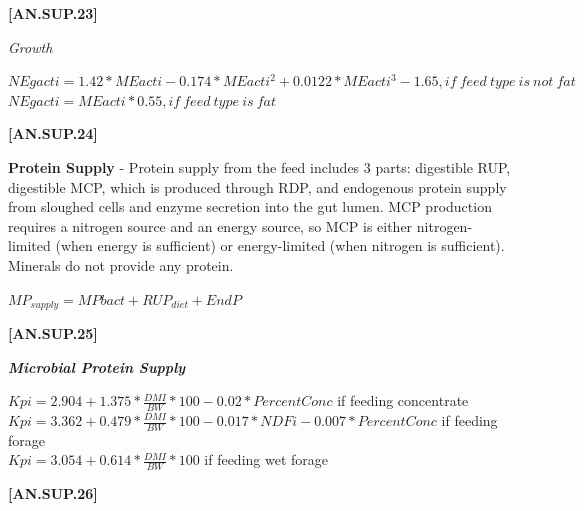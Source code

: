 \begin{refsection}
            {\raggedleft \textbf{[AN.SUP.23]}\par}
            \vspace{0.5cm}
            
\textit{Growth}
    \begin{center}
    \(NEgacti = 1.42 * MEacti - 0.174 * MEacti^{2} + 0.0122 * MEacti^{3} - 1.65, if\ feed\ type\ is\ not\ fat \)
    \(NEgacti = MEacti * 0.55, if\ feed\ type\ is\ fat \)
    \end{center}
    \vspace{0.5cm}
    
            {\raggedleft \textbf{[AN.SUP.24]}\par}
            \vspace{0.5cm}

    \textbf{ Protein Supply} - Protein supply from the feed includes 3 parts: digestible RUP, digestible MCP, which is produced through RDP, and endogenous protein supply from sloughed cells and enzyme secretion into the gut lumen. MCP production requires a nitrogen source and an energy source, so MCP is either nitrogen-limited (when energy is sufficient) or energy-limited (when nitrogen is sufficient). Minerals do not provide any protein.
    \vspace{0.2cm}

    \begin{center}
    \(MP_{supply} = MPbact + RUP_{diet} + EndP\)
    \end{center}
    \vspace{0.5cm}
    
            {\raggedleft \textbf{[AN.SUP.25]}\par}
            \vspace{0.5cm}

    \textbf{\textit{Microbial Protein Supply}} 
    \vspace{0.25cm}

    \begin{center}
    \(Kpi = 2.904 + 1.375 * \frac{DMI}{BW} * 100 - 0.02 * PercentConc\) if feeding concentrate\\
    \(Kpi = 3.362 + 0.479  * \frac{DMI}{BW} * 100 - 0.017 * NDFi - 0.007 * PercentConc\) if feeding forage\\
    \(Kpi = 3.054 + 0.614  * \frac{DMI}{BW} * 100\) if feeding wet forage
    \end{center}
    \vspace{0.5cm}
    
            {\raggedleft \textbf{[AN.SUP.26]}\par}
            \vspace{0.5cm}


\end{refsection}
